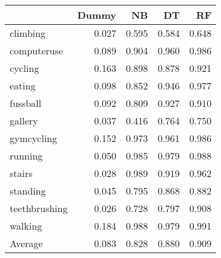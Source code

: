 \begin{tabular}{lrrrr}
\toprule
{} &  Dummy &    NB &    DT &    RF \\
\midrule
climbing      &  0.027 & 0.595 & 0.584 & 0.648 \\
computeruse   &  0.089 & 0.904 & 0.960 & 0.986 \\
cycling       &  0.163 & 0.898 & 0.878 & 0.921 \\
eating        &  0.098 & 0.852 & 0.946 & 0.977 \\
fussball      &  0.092 & 0.809 & 0.927 & 0.910 \\
gallery       &  0.037 & 0.416 & 0.764 & 0.750 \\
gymcycling    &  0.152 & 0.973 & 0.961 & 0.986 \\
running       &  0.050 & 0.985 & 0.979 & 0.988 \\
stairs        &  0.028 & 0.989 & 0.919 & 0.962 \\
standing      &  0.045 & 0.795 & 0.868 & 0.882 \\
teethbrushing &  0.026 & 0.728 & 0.797 & 0.908 \\
walking       &  0.184 & 0.988 & 0.979 & 0.991 \\
Average       &  0.083 & 0.828 & 0.880 & 0.909 \\
\bottomrule
\end{tabular}
